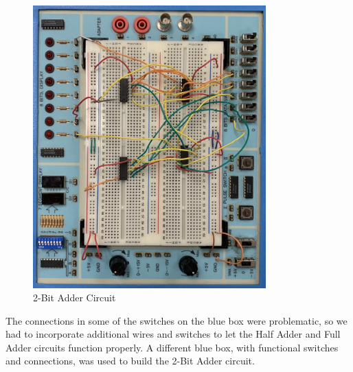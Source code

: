 \documentclass[11pt]{article}
\begin{document}
\begin{figure}\centering
	\includegraphics[width=0.8\textwidth,trim=0cm 0cm 0cm 0cm,clip]{2_Bit_Adder}
	\caption{2-Bit Adder Circuit}
	\label{fig:2_Bit_Adder}	
\end{figure}

\clearpage

The connections in some of the switches on the blue box were problematic, so we had to incorporate additional wires and switches to let the Half Adder and Full Adder circuits function properly. A different blue box, with functional switches and connections, was used to build the 2-Bit Adder circuit.
\end{document}
